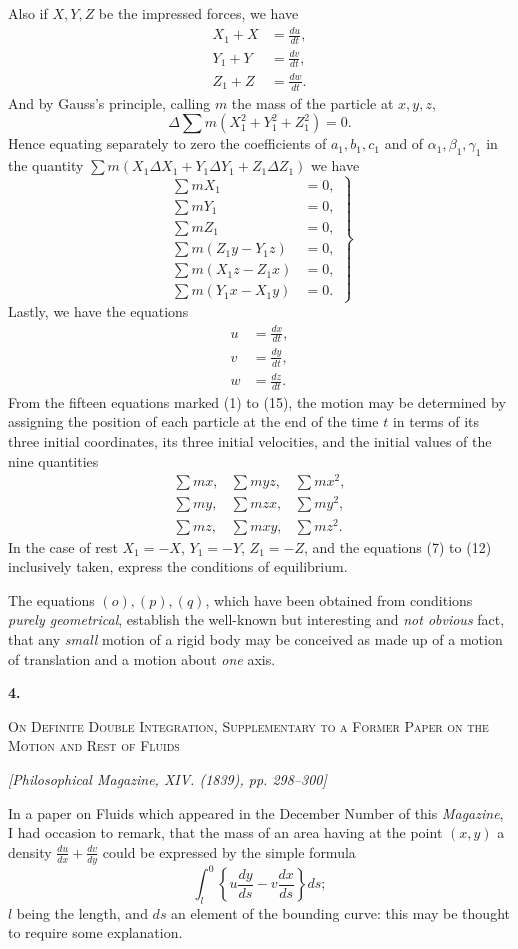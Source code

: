\documentclass[11pt]{article}
\newcommand{\paperhead}[3]{%
  \clearpage
  \begin{center}
  {\Large\bfseries #1.}\par\vspace{0.85em}
  {\large\scshape #2}\par\vspace{0.6em}
  {\itshape [#3]}\par
  \end{center}\vspace{0.4em}}
\newcommand{\sourcepage}[1]{\marginpar{\scriptsize p.~#1}}
\begin{document}
\sourcepage{35}
Also if $X,Y,Z$ be the impressed forces, we have
\begin{align}
X_1+X&=\frac{du}{dt}, \tag{4}\\
Y_1+Y&=\frac{dv}{dt}, \tag{5}\\
Z_1+Z&=\frac{dw}{dt}. \tag{6}
\end{align}
And by Gauss's principle, calling $m$ the mass of the particle at $x,y,z$,
\[
\Delta\sum m(X_1^2+Y_1^2+Z_1^2)=0.
\]
Hence equating separately to zero the coefficients of $a_1,b_1,c_1$ and of $\alpha_1,\beta_1,\gamma_1$ in the quantity $\sum m(X_1\Delta X_1+Y_1\Delta Y_1+Z_1\Delta Z_1)$ we have
\begin{equation}
\left.
\begin{aligned}
\sum mX_1&=0,\\
\sum mY_1&=0,\\
\sum mZ_1&=0,\\
\sum m(Z_1y-Y_1z)&=0,\\
\sum m(X_1z-Z_1x)&=0,\\
\sum m(Y_1x-X_1y)&=0.
\end{aligned}
\right\}\tag{7--12}
\end{equation}
Lastly, we have the equations
\begin{align}
u&=\frac{dx}{dt}, \tag{13}\\
v&=\frac{dy}{dt}, \tag{14}\\
w&=\frac{dz}{dt}. \tag{15}
\end{align}
From the fifteen equations marked (1) to (15), the motion may be determined by assigning the position of each particle at the end of the time $t$ in terms of its three initial coordinates, its three initial velocities, and the initial values of the nine quantities
\[
\begin{array}{ccc}
\sum mx,&\sum myz,&\sum mx^2,\\
\sum my,&\sum mzx,&\sum my^2,\\
\sum mz,&\sum mxy,&\sum mz^2.
\end{array}
\]
In the case of rest $X_1=-X$, $Y_1=-Y$, $Z_1=-Z$, and the equations (7) to (12) inclusively taken, express the conditions of equilibrium.

The equations $(o),(p),(q)$, which have been obtained from conditions \emph{purely geometrical}, establish the well-known but interesting and \emph{not obvious} fact, that any \emph{small} motion of a rigid body may be conceived as made up of a motion of translation and a motion about \emph{one} axis.

\paperhead{4}{On Definite Double Integration, Supplementary to a Former Paper on the Motion and Rest of Fluids}{Philosophical Magazine, XIV. (1839), pp. 298--300}
\sourcepage{36}
In a paper on Fluids which appeared in the December Number of this \emph{Magazine}, I had occasion to remark, that the mass of an area having at the point $(x,y)$ a density $\frac{du}{dx}+\frac{dv}{dy}$ could be expressed by the simple formula
\[
\int_l^0\left\{u\frac{dy}{ds}-v\frac{dx}{ds}\right\}ds;
\]
$l$ being the length, and $ds$ an element of the bounding curve: this may be thought to require some explanation.
\end{document}
